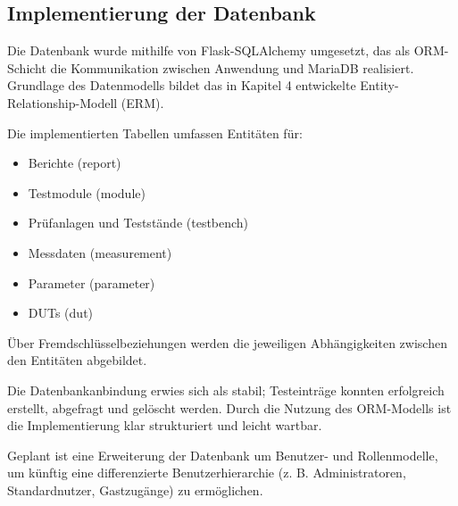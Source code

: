 \subsection{Implementierung der Datenbank}
\label{subsec:implementierung-der-datenbank}


Die Datenbank wurde mithilfe von Flask-SQLAlchemy umgesetzt, das als ORM-Schicht die Kommunikation zwischen Anwendung und MariaDB realisiert. Grundlage des Datenmodells bildet das in Kapitel 4 entwickelte Entity-Relationship-Modell (ERM).


Die implementierten Tabellen umfassen Entitäten für:


\begin{itemize}

\item
Berichte (report)




\item
Testmodule (module)




\item
Prüfanlagen und Teststände (testbench)




\item
Messdaten (measurement)




\item
Parameter (parameter)




\item
DUTs (dut)




\end{itemize}

Über Fremdschlüsselbeziehungen werden die jeweiligen Abhängigkeiten zwischen den Entitäten abgebildet.

Die Datenbankanbindung erwies sich als stabil; Testeinträge konnten erfolgreich erstellt, abgefragt und gelöscht werden. Durch die Nutzung des ORM-Modells ist die Implementierung klar strukturiert und leicht wartbar.


Geplant ist eine Erweiterung der Datenbank um Benutzer- und Rollenmodelle, um künftig eine differenzierte Benutzerhierarchie (z. B. Administratoren, Standardnutzer, Gastzugänge) zu ermöglichen.


